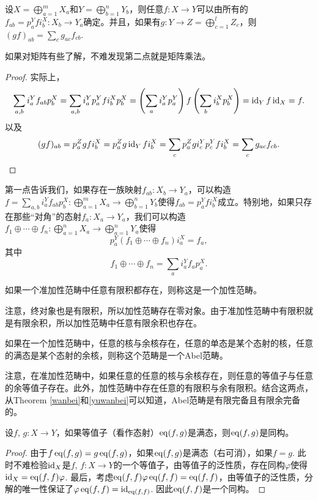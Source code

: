 \begin{pro}
设$X=\bigoplus_{a=1}^mX_a$和$Y=\bigoplus_{b=1}^nY_b$，则任意$f:X\to Y$可以由所有的$f_{ab}=p^Y_afi^X_b:X_b\to Y_a$确定。并且，如果有$g:Y\to Z=\bigoplus_{c=1}^lZ_c$，则$(gf)_{ab}=\sum_{c}g_{ac}f_{cb}$.
\end{pro}

如果对矩阵有些了解，不难发现第二点就是矩阵乘法。

\begin{proof}
实际上，
\[
	\sum_{a,b}i^Y_af_{ab}p^X_b=\sum_{a,b}i^Y_ap^Y_afi^X_bp^X_b=\left(\sum_ai^Y_ap^Y_a\right) f\left(\sum_bi^X_bp^X_b\right)=\operatorname{id}_{Y}f\operatorname{id}_{X}=f.
\]
以及
\[
	(gf)_{ab}=p^Z_agfi^X_b=p^Z_ag\operatorname{id}_Y fi^X_b=\sum_c p^Z_ag i^Y_cp^Y_c fi^X_b=\sum_{c}g_{ac}f_{cb}.
\]
\end{proof}

第一点告诉我们，如果存在一族映射$f_{ab}:X_b\to Y_a$，可以构造$f=\sum_{a,b}i^Y_af_{ab}p^X_b:\bigoplus_{a=1}^mX_a\to \bigoplus_{b=1}^nY_b$使得$f_{ab}=p^Y_afi^X_b$成立。特别地，如果只存在那些“对角”的态射$f_a:X_a\to Y_a$，我们可以构造$f_1\oplus \cdots \oplus f_n:\bigoplus_{a=1}^nX_a\to \bigoplus_{a=1}^nY_a$使得
\[
	p^Y_a(f_1\oplus \cdots \oplus f_n)i^X_a=f_a,
\]
其中
\[
	f_1\oplus \cdots \oplus f_n=\sum_{a}i^Y_af_{a}p^X_a.
\]

\begin{para}
如果一个准加性范畴中任意有限积都存在，则称这是一个加性范畴。
\end{para}

注意，终对象也是有限积，所以加性范畴存在零对象。由于准加性范畴中有限积就是有限余积，所以加性范畴中任意有限余积也存在。

\begin{para}
如果在一个加性范畴中，任意的核与余核存在，任意的单态是某个态射的核，任意的满态是某个态射的余核，则称这个范畴是一个Abel范畴。
\end{para}

注意，在准加性范畴中，如果任意的任意的核与余核存在，则任意的等值子与任意的余等值子存在。此外，加性范畴中存在任意的有限积与余有限积。结合这两点，从Theorem \ref{wanbei}和\ref{yuwanbei}可以知道，Abel范畴是有限完备且有限余完备的。

\begin{lem}
设$f$, $g:X\to Y$，如果等值子（看作态射）$\operatorname{eq}(f,g)$是满态，则$\operatorname{eq}(f,g)$是同构。
\end{lem}

\begin{proof}
由于$f\operatorname{eq}(f,g)=g\operatorname{eq}(f,g)$，如果$\operatorname{eq}(f,g)$是满态（右可消），如果$f=g$. 此时不难检验$\operatorname{id}_X$是$f$, $f:X\to Y$的一个等值子，由等值子的泛性质，存在同构$\varphi$使得$\operatorname{id}_X=\operatorname{eq}(f,f)\varphi$. 最后，考虑$\operatorname{eq}(f,f)\varphi\operatorname{eq}(f,f)=\operatorname{eq}(f,f)$，由等值子的泛性质，分解的唯一性保证了$\varphi\operatorname{eq}(f,f)=\operatorname{id}_{\operatorname{eq}(f,f)}$. 因此$\operatorname{eq}(f,f)$是一个同构。
\end{proof}

